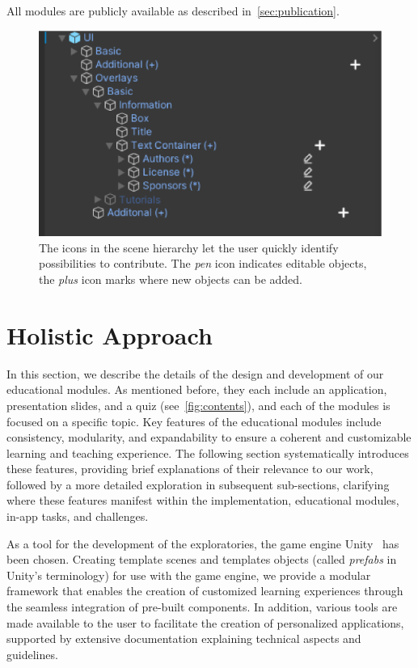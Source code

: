 All modules are publicly available as described in~\autoref{sec:publication}.
\begin{figure}[b!th]
	\centering
	\includegraphics[width=\linewidth]{pictures/userGuidance_Icons.png}
	\captionsetup{labelfont=bf,textfont=it}
	\caption{The icons in the scene hierarchy let the user quickly identify possibilities to contribute. The \emph{pen} icon indicates editable objects, the \emph{plus} icon marks where new objects can be added.\label{fig:userGuidance}}
\end{figure}


\section{Holistic Approach}
In this section, we describe the details of the design and development of our educational modules. As mentioned before, they each include an application, presentation slides, and a quiz (see~\autoref{fig:contents}), and each of the modules is focused on a specific topic. Key features of the educational modules include consistency, modularity, and expandability to ensure a coherent and customizable learning and teaching experience. The following section systematically introduces these features, providing brief explanations of their relevance to our work, followed by a more detailed exploration in subsequent sub-sections, clarifying where these features manifest within the implementation, educational modules, in-app tasks, and challenges.

As a tool for the development of the exploratories, the game engine Unity~\cite{unity:2024:editor} has been chosen. Creating template scenes and templates objects (called \emph{prefabs} in Unity's terminology) for use with the game engine, we provide a modular framework that enables the creation of customized learning experiences through the seamless integration of pre-built components. In addition, various tools are made available to the user to facilitate the creation of personalized applications, supported by extensive documentation explaining technical aspects and guidelines.

